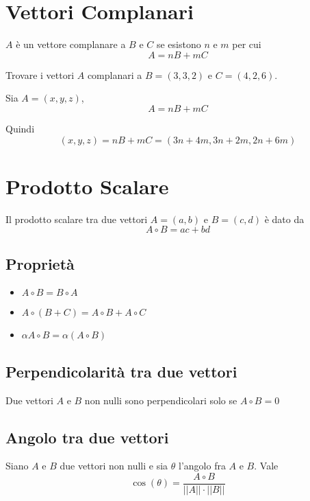 \section{Vettori Complanari}

$A$ è un vettore complanare a $B$ e $C$ se esistono $n$ e $m$ per cui $$A=nB+mC$$

\begin{example}
Trovare i vettori $A$ complanari a $B=(3,3,2)$ e $C=(4,2,6)$.

Sia $A=(x,y,z)$, $$A=nB+mC$$

Quindi $$(x,y,z)=nB+mC=(3n+4m,3n+2m,2n+6m)$$
\end{example}

\section{Prodotto Scalare}

\begin{definition}
Il prodotto scalare tra due vettori $A=(a,b)$ e $B=(c,d)$ è dato da $$A \circ B = ac+bd$$
\end{definition}

\subsection{Proprietà}

\begin{itemize}
\item $A \circ B = B \circ A$
\item $A \circ (B+C) = A \circ B + A \circ C$
\item $\alpha A \circ B = \alpha(A \circ B)$
\end{itemize}

\subsection{Perpendicolarità tra due vettori}

\begin{theorem}
Due vettori $A$ e $B$ non nulli sono perpendicolari solo se $A \circ B=0$
\end{theorem}

\subsection{Angolo tra due vettori}

\begin{theorem}
Siano $A$ e $B$ due vettori non nulli e sia $\theta$ l'angolo fra $A$ e $B$. Vale $$\cos(\theta) = \frac{A \circ B}{||A|| \cdot ||B||}$$
\end{theorem}


